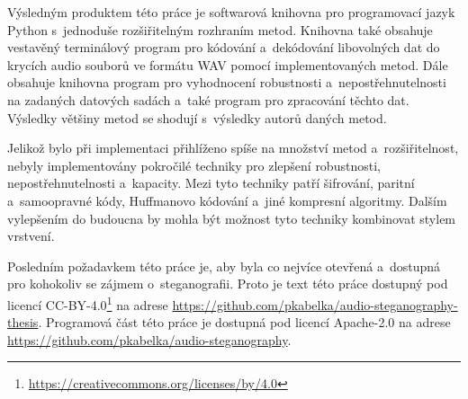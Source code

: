 Výsledným produktem této práce je softwarová knihovna pro programovací jazyk
Python s~jednoduše rozšiřitelným rozhraním metod. Knihovna také obsahuje
vestavěný terminálový program pro kódování a~dekódování libovolných dat do
krycích audio souborů ve formátu WAV pomocí implementovaných metod. Dále
obsahuje knihovna program pro vyhodnocení robustnosti a~nepostřehnutelnosti na
zadaných datových sadách a~také program pro zpracování těchto dat. Výsledky
většiny metod se shodují s~výsledky autorů daných metod.

Jelikož bylo při implementaci přihlíženo spíše na množství metod
a~rozšiřitelnost, nebyly implementovány pokročilé techniky pro zlepšení
robustnosti, nepostřehnutelnosti a~kapacity. Mezi tyto techniky patří
šifrování, paritní a~samoopravné kódy, Huffmanovo kódování a~jiné kompresní
algoritmy. Dalším vylepšením do budoucna by mohla být možnost tyto techniky
kombinovat stylem vrstvení.

Posledním požadavkem této práce je, aby byla co nejvíce otevřená a~dostupná pro
kohokoliv se zájmem o~steganografii. Proto je text této práce dostupný pod
licencí CC-BY-4.0\footnote{\url{https://creativecommons.org/licenses/by/4.0}}
na adrese \url{https://github.com/pkabelka/audio-steganography-thesis}.
Programová část této práce je dostupná pod licencí Apache-2.0 na adrese
\url{https://github.com/pkabelka/audio-steganography}.
